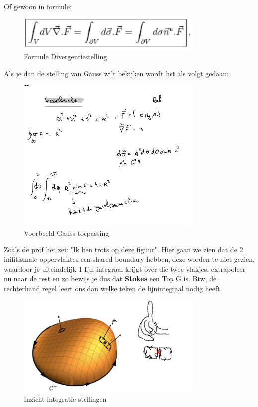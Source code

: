 \documentclass[a4paper]{article}
\begin{document}
Of gewoon in formule:

\begin{figure}[H]
	\centering
	\includegraphics[width=0.8\textwidth]{assets/formule_divergentie_wet.png}
	\caption{Formule Divergentiestelling}
	\label{fig:formule_divergentie_wet}
\end{figure}

Als je dan de stelling van Gauss wilt bekijken wordt het als volgt gedaan:

\begin{figure}[H]
	\centering
	\includegraphics[width=0.8\textwidth]{assets/voorbeeld_gauss_toepassing.png}
	\caption{Voorbeeld Gauss toepassing}
	\label{fig:voorbeeld_gauss_toepassing}
\end{figure}

Zoals de prof het zei: "Ik ben trots op deze figuur". Hier gaan we zien dat de 2 inifitismale oppervlaktes een shared boundary hebben, deze worden te niet gezien, waardoor je uiteindelijk 1 lijn integraal krijgt over die twee vlakjes, extrapoleer nu naar de rest en zo bewijs je dus dat \textbf{Stokes} een Top G is.
Btw, de rechterhand regel leert ons dan welke teken de lijnintegraal nodig heeft.

\begin{figure}[H]
	\centering
	\includegraphics[width=0.8\textwidth]{assets/inzicht_integraalstellingen.png}
	\caption{Inzicht integratie stellingen}
	\label{fig:inzicht_integraalstellingen}
\end{figure}
\end{document}
